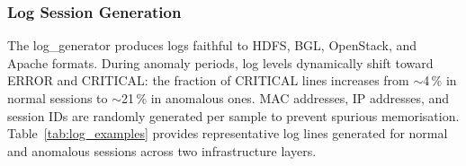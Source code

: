 \documentclass[5p, times]{elsarticle}
\begin{document}
\begin{table}[htbp]
\centering
\caption{Example of generated metric features: CDN layer (normal vs.\ anomaly)}
\label{tab:metric_examples}
\end{table}

\subsubsection{Log Session Generation}
The log\_generator produces logs faithful to HDFS, BGL, OpenStack, and Apache formats. During anomaly periods, log levels dynamically shift toward ERROR and CRITICAL: the fraction of CRITICAL lines increases from $\sim$4\,\% in normal sessions to
$\sim$21\,\% in anomalous ones. MAC addresses, IP addresses, and session IDs are randomly generated per sample to prevent spurious memorisation. Table~\ref{tab:log_examples} provides representative
log lines generated for normal and anomalous sessions across two infrastructure layers.
\end{document}

